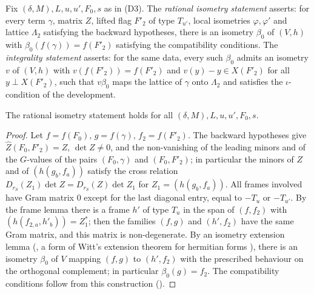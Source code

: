 \begin{definition}\label{pf:thmS-leaves:def:beta}
Fix $(\delta,M),L,u,u',F_0,s$ as in (D3). The \emph{rational isometry statement} asserts: for every term $\gamma$, matrix $Z$, lifted flag
$F'_2$ of type $T_{u'}$, local isometries $\varphi,\varphi'$ and lattice $\Lambda_2$ satisfying the backward hypotheses, there is an isometry
$\beta_0$ of $(V,h)$ with $\beta_0(f(\gamma))=f(F'_2)$ satisfying the compatibility conditions. The \emph{integrality statement} asserts:
for the same data, every such $\beta_0$ admits an isometry $v$ of $(V,h)$ with $v(f(F'_2))=f(F'_2)$ and $v(y)-y\in X(F'_2)$ for all
$y\perp X(F'_2)$, such that $v\beta_0$ maps the lattice of $\gamma$ onto $\Lambda_2$ and satisfies the $\iota$-condition of the development.
\end{definition}

\begin{lemma}\label{pf:thmS-leaves:lem:betarat}
The rational isometry statement holds for all $(\delta,M),L,u,u',F_0,s$.
\end{lemma}

\begin{proof}
Let $f=f(F_0)$, $g=f(\gamma)$, $f_2=f(F'_2)$. The backward hypotheses give $\widehat Z(F_0,F'_2)=Z$, $\det Z\ne0$, and the non-vanishing of the
leading minors and of the $G$-values of the pairs $(F_0,\gamma)$ and $(F_0,F'_2)$; in particular the minors of $Z$ and of
$(h(g_b,f_a))$ satisfy the cross relation $D_{r_S}(Z_1)\det Z=D_{r_S}(Z)\det Z_1$ for $Z_1=(h(g_b,f_a))$. All frames involved have Gram
matrix $0$ except for the last diagonal entry, equal to $-T_u$ or $-T_{u'}$. By the frame lemma
 there is a frame $h'$ of type $T_u$ in the span of $(f,f_2)$ with
$(h(f_{2,a},h'_b))=Z_1^*$; then the families $(f,g)$ and $(h',f_2)$ have the same Gram matrix, and this matrix is non-degenerate. By an
isometry extension lemma (, a form of Witt's extension
theorem for hermitian forms \cite{Scharlau1985}), there is an isometry $\beta_0$ of $V$ mapping $(f,g)$ to $(h',f_2)$ with the prescribed behaviour on
the orthogonal complement; in particular $\beta_0(g)=f_2$. The compatibility conditions follow from this construction
().
\end{proof}


